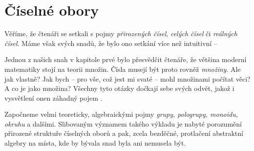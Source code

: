 \chapter{Číselné obory}
\label{chap:ciselne-obory}

Věříme, že čtenáři se setkali s pojmy \emph{přirozených čísel}, \emph{celých
čísel} či \emph{reálných čísel}. Máme však svých snadů, že bylo ono setkání více
než intuitivní -- 

Jednou z našich snah v kapitole prvé bylo přesvědčit čtenáře, že většina moderní
matematiky stojí na teorii množin. Čísla musejí být proto rovněž \emph{množiny}.
Ale jak vlastně? Jak bych -- pro vše, což jest mi svaté -- mohl množinami
počítat věci? A co je jako  množina? Všechny tyto otázky dočkají
sebe svých odvět, jakož i vysvětlení onen záhadný pojem .

Započneme velmi teoreticky, algebraickými pojmy \emph{grupy, pologrupy, monoidu,
okruhu} a dalšími. Slibovaným významem takého výkladu je nabyté porozumění
přirozené struktuře číselných oborů a pak, zcela bezděčné, protlačení abstraktní
algebry na místa, kde by bývala snad byla ani nemusela být.




